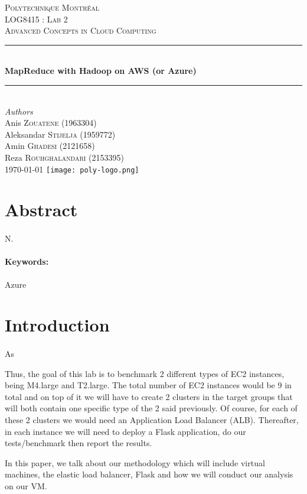 \documentclass[12pt]{article}
\begin{document}
\begin{titlepage} 
	\newcommand{\HRule}{\rule{\linewidth}{0.5mm}}
	\center
	\textsc{\LARGE Polytechnique Montréal}\\[1.5cm]
	\textsc{\Large LOG8415 : Lab 2}\\[0.5cm]
	\textsc{\large Advanced Concepts in Cloud Computing}\\[0.5cm]
	\HRule\\[0.4cm]
	{\huge\bfseries MapReduce with Hadoop on AWS (or Azure)}\\[0.4cm]
	\HRule\\[1.5cm]
	{\large\textit{Authors}}\\
	Anis \textsc{Zouatene} (1963304)\\
	Aleksandar \textsc{Stijelja} (1959772)\\
	Amin \textsc{Ghadesi} (2121658)\\
    Reza \textsc{Rouhghalandari} (2153395)\\
	\vfill\vfill\vfill {\large\today} \vfill\vfill
	\texttt{[image: poly-logo.png]}\\[1cm]
	\vfill
\end{titlepage}


\section{Abstract}
	\paragraph{} N.

	\paragraph{Keywords:}Azure
	\pagebreak

\section{Introduction} \label{sec:introduction}
	\paragraph{} As 
	\cite{1}\bigskip

    \noindent Thus, the goal of this lab is to benchmark 2 different types of EC2 instances, being M4.large and T2.large. The total number of EC2 instances would be 9 in total and on top of it we will have to create 2 clusters in the target groups that will both contain one specific type of the 2 said previously. Of course, for each of these 2 clusters we would need an Application Load Balancer (ALB). Thereafter, in each instance we will need to deploy a Flask application, do our tests/benchmark then report the results.
	\bigskip

    \noindent In this paper, we talk about our methodology which will include virtual machines, the elastic 
	load balancer, Flask and how we will conduct our analysis on our VM.
	\bigskip

	\pagebreak
\end{document}
